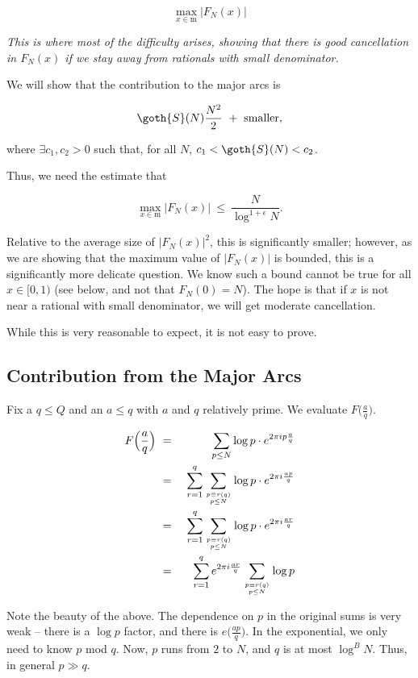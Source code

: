 \documentclass[12pt,letterpaper]{report}
\newcommand\be{\begin{equation}}
\newcommand\ee{\end{equation}}
\newcommand\bea{\begin{eqnarray}}
\newcommand\eea{\end{eqnarray}}
\begin{document}
\be \max_{x \in \mathrm{m} } |F_N(x)|  \ee

\emph{This is where most of the difficulty arises, showing that
there is good cancellation in $F_N(x)$ if we stay away from
rationals with small denominator.}

We will show that the contribution to the major arcs is

\be \goth{S}(N) \frac{N^2}{2} \ + \ \text{smaller}, \ee

where $\exists c_1, c_2 > 0$ such that, for all $N$, $c_1 <
\goth{S}(N) < c_2$.

Thus, we need the estimate that

\be \max_{x \in \mathrm{m} } |F_N(x)| \ \le \
\frac{N}{\log^{1+\epsilon} N}. \ee

Relative to the average size of $|F_N(x)|^2$, this is
significantly smaller; however, as we are showing that the maximum
value of $|F_N(x)|$ is bounded, this is a significantly more
delicate question. We know such a bound cannot be true for all $x
\in [0,1)$ (see below, and not that $F_N(0) = N$). The hope is
that if $x$ is not near a rational with small denominator, we will
get moderate cancellation.

While this is very reasonable to expect, it is not easy to prove.

\subsection{Contribution from the Major Arcs}

Fix a $q \le Q$ and an $a \le q$ with $a$ and $q$ relatively
prime. We evaluate $F\Big(\frac{a}{q}\Big)$.

\bea F\Big(\frac{a}{q}\Big) & \ = \ & \sum_{p\le N} \log p \cdot
e^{2\pi i p \frac{a}{q} } \nonumber\\ & \ = \ & \sum_{r=1}^q
\sum_{ {p \equiv r (q)} \atop {p \le N} } \log p \cdot e^{2\pi i
\frac{ap}{q} } \nonumber\\ & \ = \ & \sum_{r=1}^q \sum_{ {p \equiv
r (q)} \atop {p \le N} } \log p \cdot e^{2\pi i \frac{ar}{q} }
\nonumber\\ & \ = \ & \sum_{r=1}^q  e^{2\pi i \frac{ar}{q} }
\sum_{ {p \equiv r (q)} \atop {p \le N} } \log p \eea

Note the beauty of the above. The dependence on $p$ in the
original sums is very weak -- there is a $\log p$ factor, and
there is $e\Big( \frac{ap}{q} \Big)$. In the exponential, we only
need to know $p$ mod $q$. Now, $p$ runs from $2$ to $N$, and $q$
is at most $\log^B N$. Thus, in general $p \gg q$.
\end{document}

